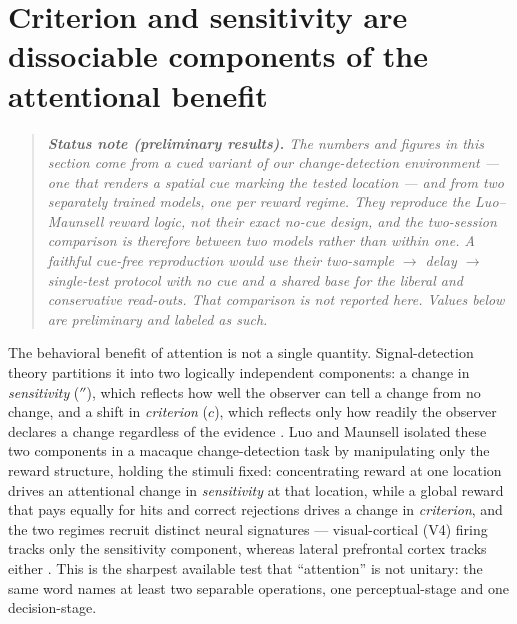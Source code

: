 \section{Criterion and sensitivity are dissociable components of the
         attentional benefit}
\label{sec:luomaunsell}

\begin{quote}\small\emph{\textbf{Status note (preliminary results).} The numbers and
figures in this section come from a \emph{cued} variant of our change-detection
environment --- one that renders a spatial cue marking the tested location --- and from
two \emph{separately trained} models, one per reward regime. They reproduce the
Luo--Maunsell \emph{reward logic}, not their exact no-cue design, and the two-session
comparison is therefore between two models rather than within one. A faithful cue-free
reproduction would use their two-sample $\rightarrow$ delay $\rightarrow$ single-test protocol
with \emph{no} cue and a shared base for the liberal and conservative read-outs. That
comparison is not reported here. Values below are preliminary and
labeled as such.}\end{quote}

The behavioral benefit of attention is not a single quantity. Signal-detection
theory partitions it into two logically independent components: a change in
\emph{sensitivity} ($\dprime$), which reflects how well the observer can tell a
change from no change, and a shift in \emph{criterion} ($c$), which reflects only
how readily the observer declares a change regardless of the evidence
\cite{MullerFindlay1987,carrasco2011_visual_attention_25y}. Luo and Maunsell
isolated these two components in a macaque change-detection task by manipulating
only the reward structure, holding the stimuli fixed: concentrating reward at one
location drives an attentional change in \emph{sensitivity} at that location, while
a global reward that pays equally for hits and correct rejections drives a change
in \emph{criterion}, and the two regimes recruit distinct neural signatures ---
visual-cortical (V4) firing tracks only the sensitivity component, whereas lateral
prefrontal cortex tracks either \cite{luo_maunsell2018_criterion_sensitivity}. This is the sharpest available test
that ``attention'' is not unitary: the same word names at least two separable
operations, one perceptual-stage and one decision-stage.


